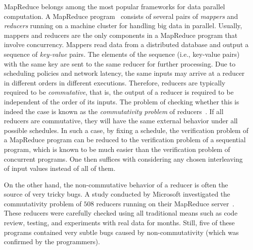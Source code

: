 \documentclass{llncs}
\begin{document}
MapReduce belongs among the most popular frameworks for data parallel
computation. A MapReduce program~\cite{dean04,hadoop} consists of several pairs
of \emph{mappers} and \emph{reducers} running on a machine cluster for handling
big data in parallel. Usually, mappers and reducers are the only components in a
MapReduce program that involve concurrency. Mappers read data from a distributed
database and output a sequence of \emph{key-value} pairs. The elements of the
sequence (i.e., key-value pairs) with the same key are sent to the same reducer
for further processing. Due to scheduling policies and network latency, the same
inputs may arrive at a reducer in different orders in different executions.
Therefore, reducers are typically required to be \emph{commutative}, that is,
the output of a reducer is required to be independent of the order of its
inputs. The problem of checking whether this is indeed the case is known as the
\emph{commutativity problem} of
reducers~\cite{csallner13testing,xiao14mr,ChenHSW15,ChenSW16}. If all reducers
are commutative, they will have the same external behavior under all possible
schedules. In such a case, by fixing a schedule, the verification problem of a
MapReduce program can be reduced to the verification problem of a sequential
program, which is known to be much easier than the verification problem of
concurrent programs. One then suffices with considering any chosen interleaving
of input values instead of all of them.


On the other hand, the non-commutative behavior of a reducer is often the source
of very tricky bugs. A study conducted by Microsoft investigated the
commutativity problem of $508$ reducers running on their MapReduce
server~\cite{xiao14mr}. These reducers were carefully checked using all
traditional means such as code review, testing, and experiments with real data
for months. Still, five of these programs contained very subtle bugs caused by
non-commutativity (which was confirmed by the programmers).
\end{document}
